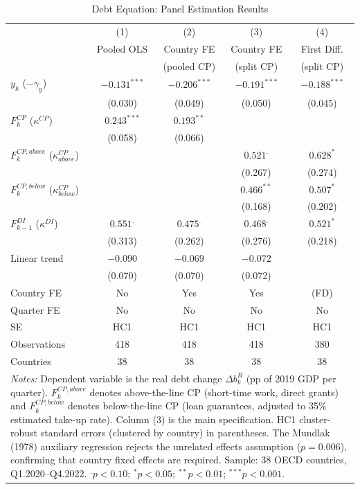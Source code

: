 \documentclass[12pt, a4paper]{article}
\begin{document}
\begin{table}[htbp]
\centering
\caption{Debt Equation: Panel Estimation Results}
\label{tab:debt_equation}
\small
\begin{tabular}{lcccc}
\toprule
 & (1) & (2) & (3) & (4) \\
 & Pooled OLS & Country FE & Country FE & First Diff. \\
 &            & (pooled CP)& (split CP) &  (split CP) \\
\midrule
$y_k$ ($-\gamma_y$)
  & $-0.131^{***}$ & $-0.206^{***}$ & $-0.191^{***}$ & $-0.188^{***}$ \\
  & (0.030)        & (0.049)        & (0.050)        & (0.045)        \\[4pt]
$F^{CP}_k$ ($\kappa^{CP}$)
  & $0.243^{***}$  & $0.193^{**}$   &                &                \\
  & (0.058)        & (0.066)        &                &                \\[4pt]
$F^{CP,above}_k$ ($\kappa^{CP}_{above}$)
  &                &                & $0.521^{.}$    & $0.628^{*}$    \\
  &                &                & (0.267)        & (0.274)        \\[4pt]
$F^{CP,below}_k$ ($\kappa^{CP}_{below}$)
  &                &                & $0.466^{**}$   & $0.507^{*}$    \\
  &                &                & (0.168)        & (0.202)        \\[4pt]
$F^{DI}_{k-1}$ ($\kappa^{DI}$)
  & $0.551^{.}$    & $0.475^{.}$    & $0.468^{.}$    & $0.521^{*}$    \\
  & (0.313)        & (0.262)        & (0.276)        & (0.218)        \\[4pt]
Linear trend
  & $-0.090$       & $-0.069$       & $-0.072$       &                \\
  & (0.070)        & (0.070)        & (0.072)        &                \\[4pt]
\midrule
Country FE       & No  & Yes & Yes & (FD) \\
Quarter FE       & No  & No  & No  & No   \\
SE               & HC1 & HC1 & HC1 & HC1  \\
Observations     & 418 & 418 & 418 & 380  \\
Countries        & 38  & 38  & 38  & 38   \\
\bottomrule
\multicolumn{5}{p{12cm}}{\footnotesize \textit{Notes:} Dependent variable is the real debt change $\Delta b^R_k$ (pp of 2019 GDP per quarter). $F^{CP,above}_k$ denotes above-the-line CP (short-time work, direct grants) and $F^{CP,below}_k$ denotes below-the-line CP (loan guarantees, adjusted to 35\% estimated take-up rate). Column (3) is the main specification. HC1 cluster-robust standard errors (clustered by country) in parentheses. The Mundlak (1978) auxiliary regression rejects the unrelated effects assumption ($p = 0.006$), confirming that country fixed effects are required. Sample: 38 OECD countries, Q1.2020--Q4.2022. $^{.}p<0.10$; $^{*}p<0.05$; $^{**}p<0.01$; $^{***}p<0.001$.} \\
\end{tabular}
\end{table}
\end{document}
